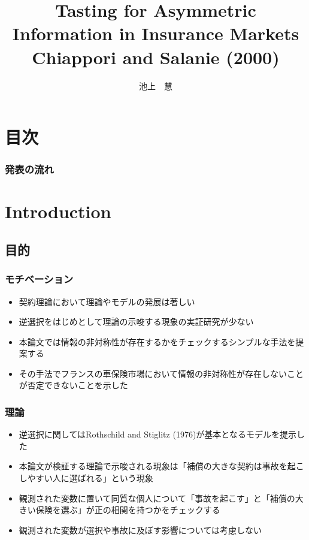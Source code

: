 \documentclass[dvipdfmx, 12pt]{beamer}
\title{Tasting for Asymmetric Information in Insurance Markets \\Chiappori and Salanie (2000)}
\author{池上　慧}
\begin{document}
\newcommand{\argmin}{\mathop{\rm arg~min}\limits}

\frame{\maketitle}

\section*{目次}
\begin{frame} \frametitle{発表の流れ}
\tableofcontents
\end{frame}

\section{Introduction}
\subsection{目的}
\begin{frame}\frametitle{モチベーション}
	\begin{itemize}
	\item 契約理論において理論やモデルの発展は著しい
	\item 逆選択をはじめとして理論の示唆する現象の実証研究が少ない
	\item 本論文では情報の非対称性が存在するかをチェックするシンプルな手法を提案する
	\item その手法でフランスの車保険市場において情報の非対称性が存在しないことが否定できないことを示した
	\end{itemize}
\end{frame}

\begin{frame}\frametitle{理論}
	\begin{itemize}
	\item 逆選択に関してはRothschild and Stiglitz (1976)が基本となるモデルを提示した
	\item 本論文が検証する理論で示唆される現象は「補償の大きな契約は事故を起こしやすい人に選ばれる」という現象
	\item 観測された変数に置いて同質な個人について「事故を起こす」と「補償の大きい保険を選ぶ」が正の相関を持つかをチェックする
	\item 観測された変数が選択や事故に及ぼす影響については考慮しない
	\end{itemize}
\end{frame}
\end{document}

